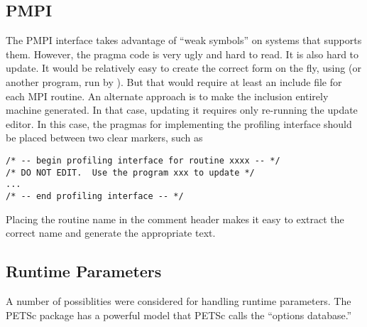 \documentclass{article}
\begin{document}
\subsection{PMPI}
The PMPI interface takes advantage of ``weak symbols'' on systems that
supports them.  However, the pragma code is very ugly and hard to
read.  It is also hard to update.
It would be relatively
easy to create the correct form on the fly, using  (or
another program, run by ).  But that
would require at least an include file for each MPI routine.
An alternate approach is to make the inclusion entirely machine
generated.  In that case, updating it requires only re-running the
update editor.  In this case, the pragmas for implementing the
profiling interface should be placed between two clear markers, such
as 
\begin{verbatim}
/* -- begin profiling interface for routine xxxx -- */
/* DO NOT EDIT.  Use the program xxx to update */
...
/* -- end profiling interface -- */
\end{verbatim}

Placing the routine name in the comment header makes it easy to
extract the correct name and generate the appropriate text.


\subsection{Runtime Parameters}
A number of possiblities were considered for handling runtime
parameters.  The PETSc package has a powerful model that PETSc calls
the ``options database.''  

\end{document}
